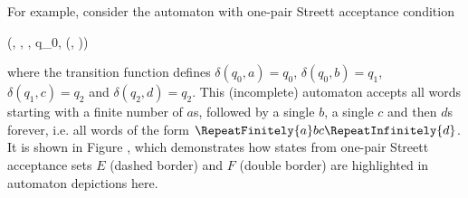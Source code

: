
    For example, consider the automaton with one-pair Streett acceptance condition

    \startformula
        (, , \delta, q_0, (, )) \EndComma
    \stopformula

    where the transition function defines $\delta(q_0, a) = q_0$, $\delta(q_0, b) = q_1$, $\delta(q_1, c) = q_2$ and $\delta(q_2, d) = q_2$.
    This (incomplete) automaton accepts all words starting with a finite number of $a$s, followed by a single $b$, a single $c$ and then $d$s forever, i.e. all words of the form $\RepeatFinitely{a} b c \RepeatInfinitely{d}$.
    It is shown in Figure , which demonstrates how states from one-pair Streett acceptance sets $E$ (dashed border) and $F$ (double border) are highlighted in automaton depictions here.

\stopsubsection

